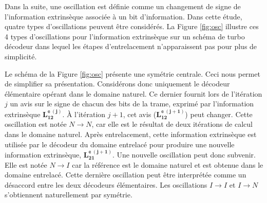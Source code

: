 

Dans la suite, une oscillation est définie comme un changement de signe de l'information extrinsèque associée à un bit
d'information. Dans cette étude, quatre types d'oscillations peuvent être considérés. La Figure 
\ref{fig:osc} illustre ces 4 types d’oscillations pour l'information extrinsèque sur un schéma de turbo décodeur dans 
lequel les étapes d'entrelacement n’apparaissent pas pour plus de simplicité.

Le schéma de la Figure \ref{fig:osc} présente une symétrie centrale. Ceci nous permet de simplifier
sa présentation. Considérons donc uniquement le décodeur élémentaire opérant dans le domaine naturel. Ce dernier 
fournit lors de l'itération $j$ un avis sur le signe de chacun des bits de la trame, exprimé par l'information extrinsèque $\mathbf{L_{12}^{\texttt{e}\ (j)}}$. À l'itération $j+1$, cet avis ($\mathbf{L_{12}^{\texttt{e}\ (j+1)}}$) peut
changer. Cette oscillation est notée $N\rightarrow N$, car elle est le résultat de deux itérations de calcul dans le 
domaine naturel. Après entrelacement, cette information extrinsèque est utilisée par le décodeur du domaine entrelacé 
pour produire une nouvelle information extrinsèque, $\mathbf{L_{21}^{\texttt{e}\ (j+1)}}$. Une nouvelle oscillation peut donc subvenir. Elle est notée $N\rightarrow I$
car la référence est le domaine naturel et est obtenue dans le domaine entrelacé. Cette dernière oscillation peut être 
interprétée comme un désaccord entre les deux décodeurs élémentaires. Les oscillations $I\rightarrow I$ et $I\rightarrow N$
s'obtiennent naturellement par symétrie.

